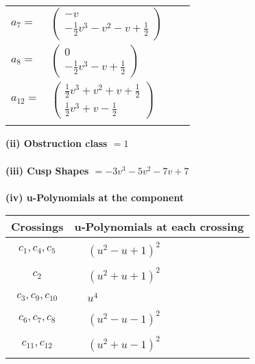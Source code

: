 \documentclass[1p]{elsarticle_modified}
\theoremstyle{definition}
\begin{document}
\begin{tabular}{m{7pt} m{180pt} m{7pt} m{180pt} }
\flushright $a_{7}=$&$\begin{pmatrix}- v\\-\frac{1}{2} v^3- v^2- v+\frac{1}{2}\end{pmatrix}$ \\
\flushright $a_{8}=$&$\begin{pmatrix}0\\-\frac{1}{2} v^3- v+\frac{1}{2}\end{pmatrix}$ \\
\flushright $a_{12}=$&$\begin{pmatrix}\frac{1}{2} v^3+v^2+v+\frac{1}{2}\\\frac{1}{2} v^3+v-\frac{1}{2}\end{pmatrix}$\\&\end{tabular}
\flushleft \textbf{(ii) Obstruction class $= 1$}\\~\\
\flushleft \textbf{(iii) Cusp Shapes $= -3 v^3-5 v^2-7 v+7$}\\~\\
\newpage\renewcommand{\arraystretch}{1}
\flushleft \textbf{(iv) u-Polynomials at the component}\newline \\
\begin{tabular}{m{50pt}|m{274pt}}
Crossings & \hspace{64pt}u-Polynomials at each crossing \\
\hline $$\begin{aligned}c_{1},c_{4},c_{5}\end{aligned}$$&$\begin{aligned}
&(u^2- u+1)^2
\end{aligned}$\\
\hline $$\begin{aligned}c_{2}\end{aligned}$$&$\begin{aligned}
&(u^2+u+1)^2
\end{aligned}$\\
\hline $$\begin{aligned}c_{3},c_{9},c_{10}\end{aligned}$$&$\begin{aligned}
&u^4
\end{aligned}$\\
\hline $$\begin{aligned}c_{6},c_{7},c_{8}\end{aligned}$$&$\begin{aligned}
&(u^2- u-1)^2
\end{aligned}$\\
\hline $$\begin{aligned}c_{11},c_{12}\end{aligned}$$&$\begin{aligned}
&(u^2+u-1)^2
\end{aligned}$\\
\hline
\end{tabular}\\~\\
\end{document}

